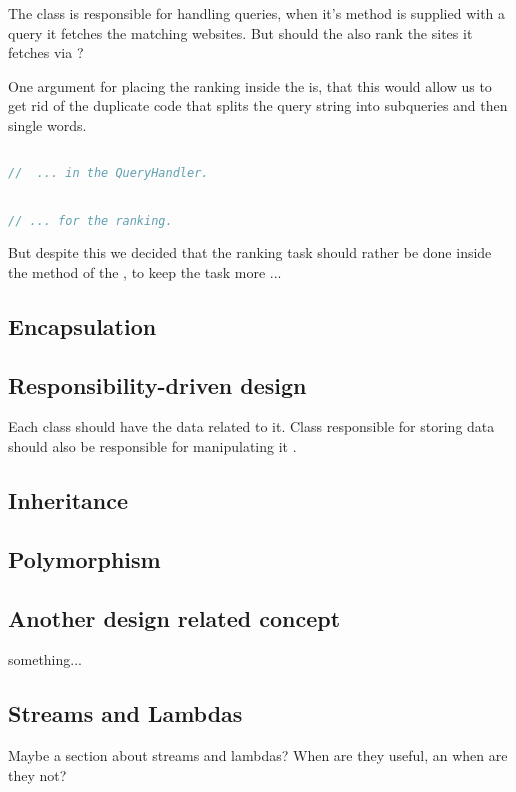 The class  is responsible for handling queries, when it's method  is supplied with a query it fetches the matching websites. But should the  also rank the sites it fetches via ? 

One argument for placing the ranking inside the  is, that this would allow us to get rid of the duplicate code that splits the query string into subqueries and then single words.  
      
\begin{lstlisting}[language=Java, caption=Splitting a query into single words.]

//  ... in the QueryHandler.


// ... for the ranking.

\end{lstlisting}
 

But despite this we decided that the ranking task should rather be done inside the  method of the , to keep the task more ...

\subsection{Encapsulation} 

\subsection{Responsibility-driven design}
Each class should have the data related to it.
Class responsible for storing data should also be responsible for manipulating it \cite{BK}.
 
\subsection{Inheritance} 

\subsection{Polymorphism} 

\subsection{Another design related concept}
something...
 
\subsection{Streams and Lambdas}
Maybe a section about streams and lambdas? When are they useful, an when are they not?


 
